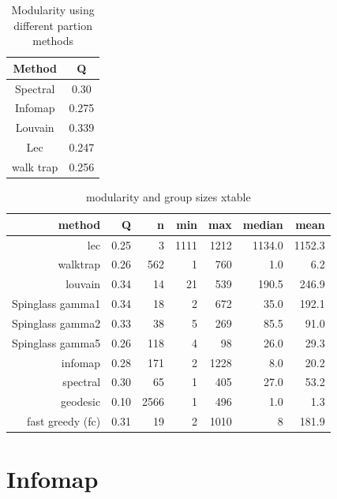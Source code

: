 \begin{table}[]
    \centering
    \begin{tabular}{cc}
    \toprule
        Method & Q \\
        \midrule
        Spectral & 0.30\\
        Infomap & 0.275\\
        Louvain & 0.339\\
        Lec & 0.247\\
        walk trap & 0.256\\
        \bottomrule
    \end{tabular}
    \caption{Modularity using different partion methods}
    \label{tab:modularity}
\end{table}




\begin{table}[ht]
\centering

\begin{tabular}{rrrrrrr}
  \toprule
method & Q & n & min & max & median & mean \\ 
  \midrule
lec & 0.25 & 3 & 1111 & 1212 & 1134.0 & 1152.3 \\ 
  walktrap & 0.26 & 562 & 1 & 760 & 1.0 & 6.2 \\ 
  louvain & 0.34 & 14 & 21 & 539 & 190.5 & 246.9 \\ 
  Spinglass gamma1 & 0.34 & 18 & 2 & 672 & 35.0 & 192.1 \\ 
  Spinglass gamma2 & 0.33 & 38 & 5 & 269 & 85.5 & 91.0 \\ 
  Spinglass gamma5 & 0.26 & 118 & 4 & 98 & 26.0 & 29.3 \\ 
  infomap & 0.28 & 171 & 2 & 1228 & 8.0 & 20.2 \\ 
  spectral & 0.30 & 65 & 1 & 405 & 27.0 & 53.2 \\ 
  geodesic & 0.10 & 2566 & 1 & 496 & 1.0 & 1.3 \\ 
  fast greedy (fc) & 0.31 & 19 & 2 & 1010 & 8 & 181.9 \\
   \bottomrule
\end{tabular}
\caption{modularity and group sizes xtable} 
\label{tab:modularity and group sizes xtable}
\end{table}


\section{Infomap}
\label{sec:infomap in methods}


